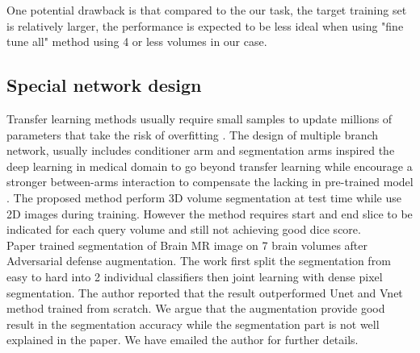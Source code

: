 One potential drawback is that compared to the our task, the target training set is relatively larger, the performance is expected to be less ideal when using "fine tune all" method using 4 or less volumes in our case.

\subsection{Special network design}
Transfer learning methods usually require small samples to update millions of parameters that take the risk of overfitting \cite{shaban_one-shot_2017}. The design of multiple branch network, usually includes conditioner arm and segmentation arms inspired the deep learning in medical domain to go beyond transfer learning while encourage a stronger between-arms interaction to compensate the lacking in pre-trained model \cite{roy_squeeze_2019}. The proposed method perform 3D volume segmentation at test time while use 2D images during training. However the method requires start and end slice to be indicated for each query volume and still not achieving good dice score.\\

Paper \cite{suk_brain_2019} trained segmentation of Brain MR image on 7 brain volumes after Adversarial defense augmentation. The work first split the segmentation from easy to hard into 2 individual classifiers then joint learning with dense pixel segmentation. The author reported that the result outperformed Unet and Vnet method trained from scratch. We argue that the augmentation provide good result in the segmentation accuracy while the segmentation part is not well explained in the paper. We have emailed the author for further details.

